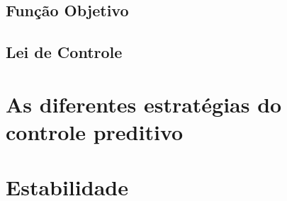 
\subsection{Função Objetivo}
\label{subsec:funcao_objetivo}


\subsection{Lei de Controle}
\label{subsec:lei_de_controle}


\section{As diferentes estratégias do controle preditivo}
\label{sec:diferentes_estrategias_controle_preditivo}


\section{Estabilidade}
\label{sec:estabilidade}


